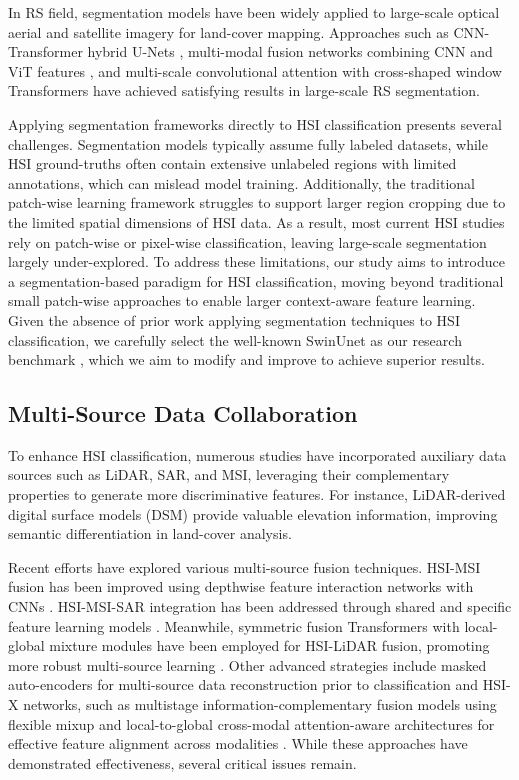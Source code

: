 In RS field, segmentation models have been widely applied to large-scale optical aerial and satellite imagery for land-cover mapping. Approaches such as CNN-Transformer hybrid U-Nets \cite{swinunet-rs}, multi-modal fusion networks combining CNN and ViT features \cite{transunet-rs}, and multi-scale convolutional attention with cross-shaped window Transformers \cite{mcatunet} have achieved satisfying results in large-scale RS segmentation.

Applying segmentation frameworks directly to HSI classification presents several challenges. Segmentation models typically assume fully labeled datasets, while HSI ground-truths often contain extensive unlabeled regions with limited annotations, which can mislead model training. Additionally, the traditional patch-wise learning framework struggles to support larger region cropping due to the limited spatial dimensions of HSI data. As a result, most current HSI studies rely on patch-wise or pixel-wise classification, leaving large-scale segmentation largely under-explored. To address these limitations, our study aims to introduce a segmentation-based paradigm for HSI classification, moving beyond traditional small patch-wise approaches to enable larger context-aware feature learning. Given the absence of prior work applying segmentation techniques to HSI classification, we carefully select the well-known SwinUnet as our research benchmark , which we aim to modify and improve to achieve superior results.


\subsection{Multi-Source Data Collaboration}
To enhance HSI classification, numerous studies have incorporated auxiliary data sources such as LiDAR, SAR, and MSI, leveraging their complementary properties to generate more discriminative features. For instance, LiDAR-derived digital surface models (DSM) provide valuable elevation information, improving semantic differentiation in land-cover analysis.

Recent efforts have explored various multi-source fusion techniques. HSI-MSI fusion has been improved using depthwise feature interaction networks with CNNs  \cite{hsi-msi}. HSI-MSI-SAR integration has been addressed through shared and specific feature learning models \cite{hsi-msi-sar}. Meanwhile, symmetric fusion Transformers with local-global mixture modules have been employed for HSI-LiDAR fusion, promoting more robust multi-source learning \cite{hsi-lidar}. Other advanced strategies include masked auto-encoders for multi-source data reconstruction prior to classification \cite{ssmae} and HSI-X networks, such as multistage information-complementary fusion models using flexible mixup \cite{hsi-x-1} and local-to-global cross-modal attention-aware architectures for effective feature alignment across modalities \cite{hsi-x-2}. While these approaches have demonstrated effectiveness, several critical issues remain.

